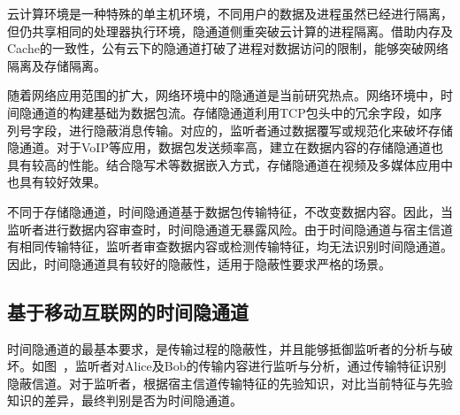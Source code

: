 云计算环境是一种特殊的单主机环境，不同用户的数据及进程虽然已经进行隔离，但仍共享相同的处理器执行环境，隐通道侧重突破云计算的进程隔离。借助内存及Cache的一致性，公有云下的隐通道打破了进程对数据访问的限制，能够突破网络隔离及存储隔离。

随着网络应用范围的扩大，网络环境中的隐通道是当前研究热点。网络环境中，时间隐通道的构建基础为数据包流。存储隐通道利用TCP包头中的冗余字段，如序列号字段，进行隐蔽消息传输。对应的，监听者通过数据覆写或规范化来破坏存储隐通道。对于VoIP等应用，数据包发送频率高，建立在数据内容的存储隐通道也具有较高的性能。结合隐写术等数据嵌入方式，存储隐通道在视频及多媒体应用中也具有较好效果。

不同于存储隐通道，时间隐通道基于数据包传输特征，不改变数据内容。因此，当监听者进行数据内容审查时，时间隐通道无暴露风险。由于时间隐通道与宿主信道有相同传输特征，监听者审查数据内容或检测传输特征，均无法识别时间隐通道。因此，时间隐通道具有较好的隐蔽性，适用于隐蔽性要求严格的场景。

\subsection{基于移动互联网的时间隐通道}
\label{sec:intro:background:ctc}

时间隐通道的最基本要求，是传输过程的隐蔽性，并且能够抵御监听者的分析与破坏。如图\ ，监听者对Alice及Bob的传输内容进行监听与分析，通过传输特征识别隐蔽信道。对于监听者，根据宿主信道传输特征的先验知识，对比当前特征与先验知识的差异，最终判别是否为时间隐通道。



